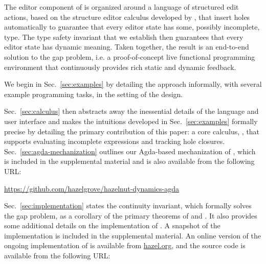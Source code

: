 The editor component of \Hazel is organized around a language of structured edit actions, 
based on the \Hazelnut structure editor calculus developed by \citet{popl-paper}, that insert holes automatically to guarantee that
every editor state has some, possibly incomplete, type. 
The type safety invariant that we establish then guarantees that every editor state has dynamic meaning. Taken together, the result is an end-to-end solution to the gap problem, i.e. a proof-of-concept
live functional programming environment that continuously provides rich static and dynamic feedback.

\vspace{-2px}

\newcommand{\contribution}[2]{\paragraph{#1. #2}} 


We begin in Sec.~\ref{sec:examples} by detailing the approach informally, with several example programming tasks, in the setting of the \Hazel design. 

Sec.~\ref{sec:calculus} then abstracts away the inessential details of the language and user interface and makes the  intuitions developed in Sec.~\ref{sec:examples} formally precise by detailing the primary contribution of this paper: a core calculus, \HazelnutLive, that supports evaluating incomplete expressions and tracking hole closures. 
Sec.~\ref{sec:agda-mechanization} outlines our Agda-based mechanization of \HazelnutLive, which is included in the supplemental material and is also available from the following URL: 

\begin{center}
\url{https://github.com/hazelgrove/hazelnut-dynamics-agda}
\end{center}

\noindent
Sec.~\ref{sec:implementation} states the continuity invariant, which formally solves the gap problem, as a corollary of the primary theorems of \Hazelnut and \HazelnutLive. It also provides some additional details on the implementation of \Hazel. A snapshot of the implementation is included in the supplemental material. An online version of the ongoing implementation of \Hazel is available from \url{hazel.org}, and the source code is available from the following URL:

